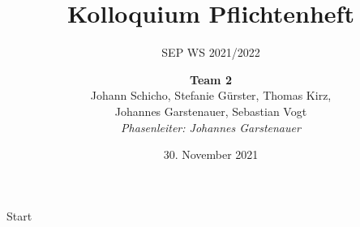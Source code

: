 \documentclass{beamer}
\title{Kolloquium Pflichtenheft}
\subtitle{SEP WS 2021/2022}
\date{\small 30. November 2021}
\author{\textbf{Team 2} \\ \small {Johann Schicho, Stefanie Gürster, Thomas Kirz,\\ Johannes Garstenauer, Sebastian Vogt} \\ \vspace{0.5cm}\emph{Phasenleiter: Johannes Garstenauer}\normalsize}
\begin{document}
    \begin{frame}{Start}
        \titlepage
    \end{frame}

\end{document}

